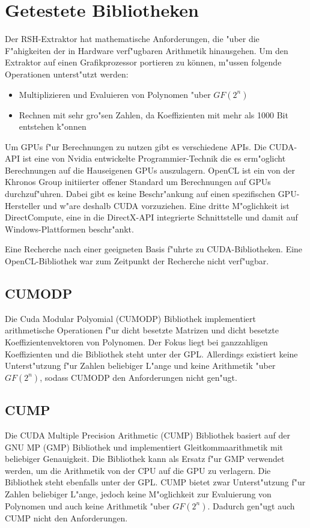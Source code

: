 \section{Getestete Bibliotheken}
\label{Bibliotheken}

Der RSH-Extraktor hat mathematische Anforderungen, die "uber die F"ahigkeiten der in Hardware verf"ugbaren Arithmetik hinausgehen. Um den Extraktor auf einen Grafikprozessor portieren zu können, m"ussen folgende Operationen unterst"utzt werden:
\begin{itemize}
	\item Multiplizieren und Evaluieren von Polynomen "uber $GF(2^n)$
	\item Rechnen mit sehr gro"sen Zahlen, da Koeffizienten mit mehr als 1000 Bit entstehen k"onnen
\end{itemize}

Um GPUs f"ur Berechnungen zu nutzen gibt es verschiedene APIs. Die CUDA-API ist eine von Nvidia entwickelte Programmier-Technik die es erm"oglicht Berechnungen auf die Hauseigenen GPUs auszulagern. OpenCL ist ein von der Khronos Group initiierter offener Standard um Berechnungen auf GPUs durchzuf"uhren. Dabei gibt es keine Beschr"ankung auf einen spezifischen GPU-Hersteller und w"are deshalb CUDA vorzuziehen. Eine dritte M"oglichkeit ist DirectCompute, eine in die DirectX-API integrierte Schnittstelle und damit auf Windows-Plattformen beschr"ankt.

Eine Recherche nach einer geeigneten Basis f"uhrte zu CUDA-Bibliotheken. Eine OpenCL-Bibliothek war zum Zeitpunkt der Recherche nicht verf"ugbar.

\subsection{CUMODP}
Die Cuda Modular Polyomial (CUMODP) Bibliothek implementiert arithmetische Operationen f"ur dicht besetzte Matrizen und dicht besetzte Koeffizientenvektoren von Polynomen. Der Fokus liegt bei ganzzahligen Koeffizienten und die Bibliothek steht unter der GPL.
Allerdings existiert keine Unterst"utzung f"ur Zahlen beliebiger L"ange und keine Arithmetik "uber $GF(2^n)$, sodass CUMODP den Anforderungen nicht gen"ugt.

\subsection{CUMP}
Die CUDA Multiple Precision Arithmetic (CUMP) Bibliothek basiert auf der GNU MP (GMP) Bibliothek und implementiert Gleitkommaarithmetik mit beliebiger Genauigkeit. Die Bibliothek kann als Ersatz f"ur GMP verwendet werden, um die Arithmetik von der CPU auf die GPU zu verlagern. Die Bibliothek steht ebenfalls unter der GPL.
CUMP bietet zwar Unterst"utzung f"ur Zahlen beliebiger L"ange, jedoch keine M"oglichkeit zur Evaluierung von Polynomen und auch keine Arithmetik "uber $GF(2^n)$. Dadurch gen"ugt auch CUMP nicht den Anforderungen.

